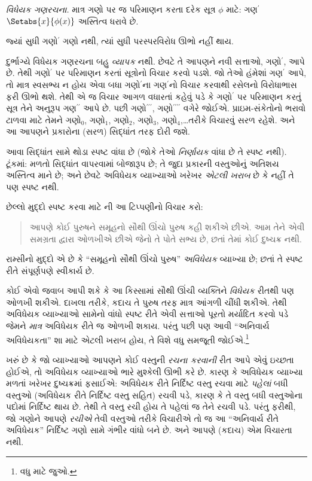 \begin{defish}
\emph{વિધેયક ગણરચના.} માત્ર ગણો પર જ પરિમાણન કરતા દરેક સૂત્ર $\phi$ માટે: ગણ$^\prime$ $\Setabs{x}{\phi(x)}$ અસ્તિત્વ ધરાવે છે.
\end{defish}

જ્યાં સુધી ગણો$^{\prime}$ ગણો નથી, ત્યાં સુધી પરસ્પરવિરોધ ઊભો નહીં થાય.

દુર્ભાગ્યે વિધેયક ગણરચના બહુ \emph{વ્યાપક} નથી. છેવટે તે આપણને
નવી સત્તાઓ, ગણો$^\prime$, આપે છે. તેથી ગણો$^\prime$ પર પરિમાણન
કરતાં સૂત્રોનો વિચાર કરવો પડશે. જો તેઓ હંમેશાં ગણ$^\prime$ આપે,
તો માત્ર સ્વસભ્ય ન હોય એવા બધા ગણો$^\prime$ના ગણ$^\prime$નો
વિચાર કરવાથી રસેલનો વિરોધાભાસ ફરી ઊભો થશે. તેથી એ જ વિચાર
આગળ વધારતાં કહેવું પડે કે ગણો$^\prime$ પર પરિમાણન કરતું સૂત્ર
તેને અનુરૂપ ગણ$^{\prime\prime}$ આપે છે. પછી
ગણો$^{\prime\prime\prime}$,
ગણો$^{\prime\prime\prime\prime}$ વગેરે જોઈએ.
પ્રાઇમ-સંકેતોનો ભરાવો ટાળવા માટે તેમને ગણો$_0$, ગણો$_1$, ગણો$_2$,
ગણો$_3$, ગણો$_4$,\ldots તરીકે વિચારવું સરળ રહેશે. અને આ આપણને
પ્રકારોના (સરળ) સિદ્ધાંત તરફ દોરી જશે.

આવા સિદ્ધાંત સામે થોડા સ્પષ્ટ વાંધા છે (જોકે તેઓ
\emph{નિર્ણાયક} વાંધા છે તે સ્પષ્ટ નથી). ટૂંકમાં: મળતો સિદ્ધાંત
વાપરવામાં બોજારૂપ છે; તે જુદા પ્રકારની વસ્તુઓનું અતિશય અસ્તિત્વ
માને છે; અને છેવટે અવિધેયક વ્યાખ્યાઓ ખરેખર \emph{એટલી ખરાબ}
છે કે નહીં તે પણ સ્પષ્ટ નથી.

છેલ્લો મુદ્દો સ્પષ્ટ કરવા માટે \citeauthor{Ramsey1925}ની આ
ટિપ્પણીનો વિચાર કરો:
\begin{quote}
આપણે કોઈ પુરુષને સમૂહનો સૌથી ઊંચો પુરુષ કહી શકીએ છીએ. આમ તેને
એવી સમગ્રતા દ્વારા ઓળખીએ છીએ જેનો તે પોતે સભ્ય છે, છતાં તેમાં
કોઈ દુષ્ચક્ર નથી. \citep{Ramsey1925}
\end{quote}
રામ્સીનો મુદ્દો એ છે કે ``સમૂહનો સૌથી ઊંચો પુરુષ'' \emph{અવિધેયક}
વ્યાખ્યા છે; છતાં તે સ્પષ્ટ રીતે સંપૂર્ણપણે સ્વીકાર્ય છે.

કોઈ એવો જવાબ આપી શકે કે આ કિસ્સામાં સૌથી ઊંચી વ્યક્તિને
\emph{વિધેયક} રીતથી પણ ઓળખી શકીએ. દાખલા તરીકે, કદાચ તે પુરુષ
તરફ માત્ર આંગળી ચીંધી શકીએ. તેથી અવિધેયક વ્યાખ્યાઓ સામેનો વાંધો
સ્પષ્ટ રીતે એવી સત્તાઓ પૂરતો મર્યાદિત કરવો પડે જેમને
\emph{માત્ર} અવિધેયક રીતે જ ઓળખી શકાય. પરંતુ પછી પણ આવી
``અનિવાર્ય અવિધેયકતા'' શા માટે એટલી ખરાબ હોય, તે વિશે વધુ
સમજૂતી જોઈએ.\footnote{વધુ માટે \citet{Linnebo2010} જુઓ.}

ખરું છે કે જો વ્યાખ્યાઓ આપણને કોઈ વસ્તુની \emph{રચના કરવાની}
રીત આપે એવું ઇચ્છતા હોઈએ, તો અવિધેયક વ્યાખ્યાઓ ભારે મુશ્કેલી
ઊભી કરે છે. કારણ કે અવિધેયક વ્યાખ્યા મળતાં ખરેખર દુષ્ચક્રમાં
ફસાઈએ: અવિધેયક રીતે નિર્દિષ્ટ વસ્તુ રચવા માટે \emph{પહેલાં}
બધી વસ્તુઓ (અવિધેયક રીતે નિર્દિષ્ટ વસ્તુ સહિત) રચવી પડે, કારણ
કે તે વસ્તુ બધી વસ્તુઓના પદોમાં નિર્દિષ્ટ થાય છે. તેથી તે વસ્તુ
રચી હોય તે પહેલાં જ તેને રચવી પડે. પરંતુ ફરીથી, જો ગણોને આપણે
\emph{રચીએ} તેવી વસ્તુઓ તરીકે વિચારીએ તો જ આ ``અનિવાર્ય રીતે
અવિધેયક'' નિર્દિષ્ટ ગણો સામે ગંભીર વાંધો બને છે. અને આપણે
(કદાચ) એમ વિચારતા નથી.


